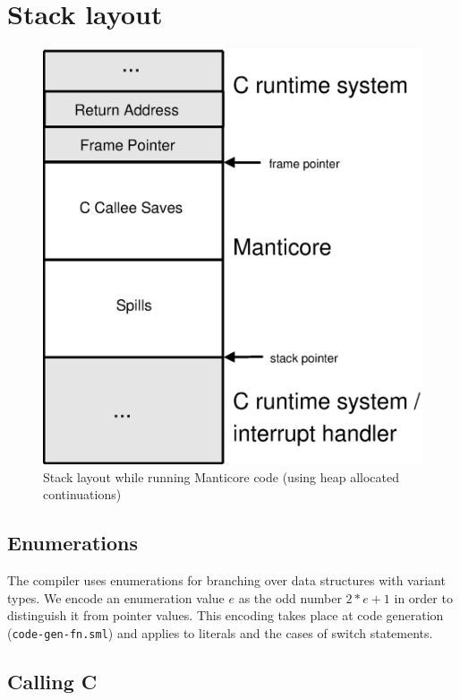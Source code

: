 \documentclass[11pt]{article}
\begin{document}
\section{Stack layout}
\begin{figure}[tp]
  \begin{center}
    \includegraphics[scale=0.5]{pictures/stack-heap-alloc}
  \end{center}%
  \caption{Stack layout while running Manticore code (using heap allocated
    continuations)}
  \label{fig:stack-heap-alloc}
\end{figure}%

\subsection{Enumerations}
The compiler uses enumerations for branching over data structures with variant types.
We encode an enumeration value $e$ as the odd number $2*e+1$ in order to distinguish it from pointer
values.
This encoding takes place at code generation ({\tt code-gen-fn.sml}) and applies to literals
and the cases of switch statements.

\subsection{Calling C}
\end{document}
